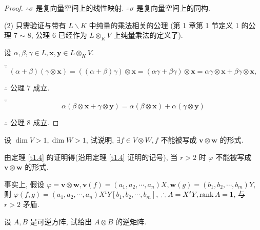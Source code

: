\documentclass[color=black,device=normal,lang=cn,mode=geye]{elegantnote}
\begin{document}
\begin{proof}
    $\therefore\sigma$ 是复向量空间上的线性映射. $\therefore\sigma$ 是复向量空间上的同构.

    (2) 只需验证与带有 $L\backslash K$ 中纯量的乘法相关的公理 (第 1 章第 1 节定义 1 的公理 7 $\sim$ 8, 公理 6 已经作为 $L\otimes_KV$ 上纯量乘法的定义了).

    设 $\alpha,\beta,\gamma\in L,\boldsymbol{x},\boldsymbol{y}\in L\otimes_KV$.

    $\because$
    \[(\alpha+\beta)(\gamma\otimes\boldsymbol{x})=((\alpha+\beta)\gamma)\otimes\boldsymbol{x}=(\alpha\gamma+\beta\gamma)\otimes\boldsymbol{x}=\alpha\gamma\otimes\boldsymbol{x}+\beta\gamma\otimes\boldsymbol{x},\]

    $\therefore$ 公理 7 成立.

    $\because$
    \[\alpha(\beta\otimes\boldsymbol{x}+\gamma\otimes\boldsymbol{y})=\alpha(\beta\otimes\boldsymbol{x})+\alpha(\gamma\otimes\boldsymbol{y})\]

    $\therefore$ 公理 8 成立.
\end{proof}
\begin{exercise}%
    设 $\dim V>1,\dim W>1$, 试说明, $\exists f\in V\otimes W,f$ 不能被写成 $\boldsymbol{v}\otimes\boldsymbol{w}$ 的形式.
\end{exercise}
\begin{solution}
    由定理 \ref{t1.4} 的证明得(沿用定理 \ref{t1.4} 证明的记号), 当 $r>2$ 时 $\varphi$ 不能被写成 $\boldsymbol{v}\otimes\boldsymbol{w}$ 的形式.
    
    事实上, 假设 $\varphi=\boldsymbol{v}\otimes\boldsymbol{w},\boldsymbol{v}(f)=(a_1,a_2,\cdots,a_n)X,\boldsymbol{w}(g)=(b_1,b_2,\cdots,b_m)Y$, 则 $\varphi(f,g)=(a_1,a_2,\cdots,a_n)X{}^tY[b_1,b_2,\cdots,b_m]$, $\therefore A=X{}^tY,\operatorname{rank} A=1$, 与 $r>2$ 矛盾.
\end{solution}
\begin{exercise}%
    设 $A,B$ 是可逆方阵, 试给出 $A\otimes B$ 的逆矩阵.
\end{exercise}
\end{document}
